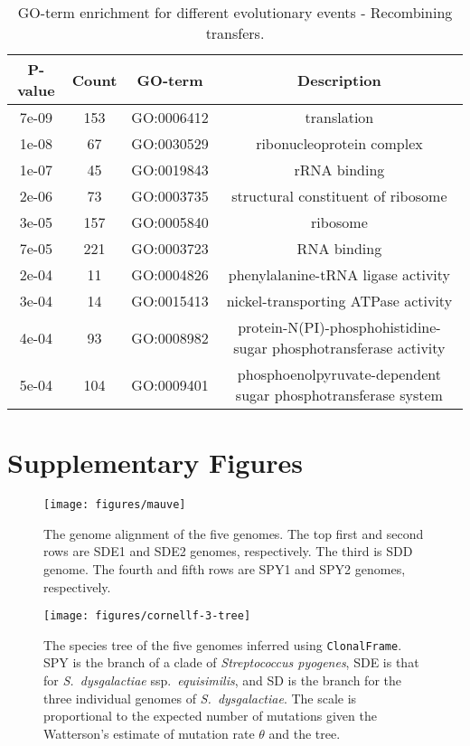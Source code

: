 \documentclass[english]{article}
\begin{document}
%
\begin{table}
\caption{\label{tab:go-events-recombining}GO-term enrichment for different
evolutionary events - Recombining transfers.}
\begin{tabular}{cccc}
\hline 
P-value & Count & GO-term & Description \\
\hline 
7e-09 & 153 & GO:0006412 & translation\\
1e-08 &  67 & GO:0030529 & ribonucleoprotein complex\\
1e-07 &  45 & GO:0019843 & rRNA binding\\
2e-06 &  73 & GO:0003735 & structural constituent of ribosome\\
3e-05 & 157 & GO:0005840 & ribosome\\
7e-05 & 221 & GO:0003723 & RNA binding\\
2e-04 &  11 & GO:0004826 & phenylalanine-tRNA ligase activity\\
3e-04 &  14 & GO:0015413 & nickel-transporting ATPase activity\\
4e-04 &  93 & GO:0008982 & protein-N(PI)-phosphohistidine-sugar phosphotransferase activity\\
5e-04 & 104 & GO:0009401 & phosphoenolpyruvate-dependent sugar phosphotransferase system\\
\hline 
\end{tabular}
\end{table}
\clearpage{}

\section*{Supplementary Figures}

\clearpage{}

\begin{figure}
\begin{center}
\texttt{[image: figures/mauve]}
\end{center}
\caption{\label{fig:mauve}The genome alignment of the five genomes. The top
first and second rows are SDE1 and SDE2 genomes, respectively. The third is SDD
genome. The fourth and fifth rows are SPY1 and SPY2 genomes, respectively.}
\end{figure}
\clearpage{}

\begin{figure}
\texttt{[image: figures/cornellf-3-tree]}
\caption{\label{fig:tree5}The species tree of the five genomes inferred using
\texttt{ClonalFrame}.  SPY is the branch of a clade of \textit{Streptococcus
pyogenes}, SDE is that for \textit{S.\ dysgalactiae} ssp.\textit{\ equisimilis},
and SD is the branch for the three individual genomes of \textit{S.\
dysgalactiae}. The scale is proportional to the expected number of mutations
given the Watterson's estimate of mutation rate $\theta$ and the tree.}
\end{figure}
\clearpage{}%
\end{document}
